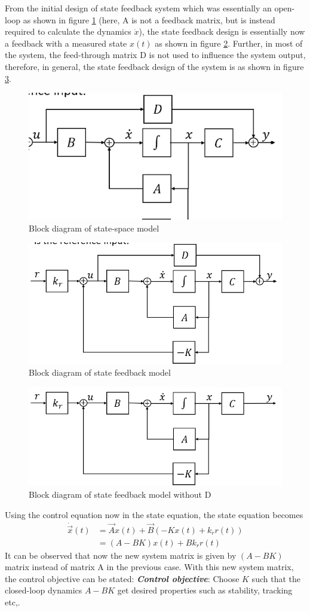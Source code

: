 From the initial design of state feedback system which was essentially an open-loop as shown in figure \ref{Fig_StSp_OL_Design} (here, A is not a feedback matrix, but is instead required to calculate the dynamics $\dot{x}$), the state feedback design is essentially now a feedback with a measured state $x(t)$ as shown in figure \ref{Fig_StSp_CL_Design}. Further, in most of the system, the feed-through matrix D is not used to influence the system output, therefore, in general, the state feedback design of the system is as shown in figure \ref{Fig_StSp_without_D}.
\begin{figure}[h!]
	\centering
	\includegraphics[width=0.6\linewidth]{Bilder/StSp_OL_Design}
	\caption{Block diagram of state-space model}
	\label{Fig_StSp_OL_Design}
\end{figure}
\begin{figure}[h!]
	\centering
	\includegraphics[width=0.6\linewidth]{Bilder/StSp_CL_Design}
	\caption{Block diagram of state feedback model}
	\label{Fig_StSp_CL_Design}
\end{figure}
\begin{figure}[h!]
	\centering
	\includegraphics[width=0.6\linewidth]{Bilder/StSp_without_D}
	\caption{Block diagram of state feedback model without D}
	\label{Fig_StSp_without_D}
\end{figure}
\newpage

Using the control equation now in the state equation, the state equation becomes
\begin{align}
	\dot{\vec{x}}(t) &= \vec{A} x(t) + \vec{B} (-Kx(t) + k_r r(t)) \\
					&= (A - B K) x(t) + B k_r r(t) \label{Eq_StSp_FB_Model}
\end{align}
It can be observed that now the new system matrix is given by $(A - B K)$ matrix instead of matrix A in the previous case. With this new system matrix, the control objective can be stated:
\textbf{\textit{Control objective}}: Choose $K$ such that the closed-loop dynamics $A - BK$ get desired properties such as stability, tracking etc,.

